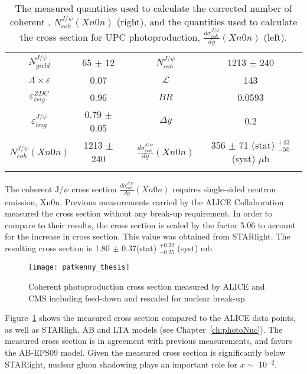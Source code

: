    \begin{table}
      \centering
      \begin{tabular}{|c|c|c|c|c|} \hhline{--~--} 
        $N^{J/\psi}_{yield}$ & 65 $\pm$ 12 & & $N^{J/\psi}_{coh}$  & 1213 $\pm$ 240 \\ \hhline{--~--}  
        $A\times \varepsilon$ & 0.07 & & $\mathcal{L}$ & 143 \\ \hhline{--~--}
        $\varepsilon^{ZDC}_{trig}$ & 0.96 & & $BR$ & 0.0593 \\ \hhline{--~--}
        $\varepsilon^{J/\psi}_{trig}$ & 0.79 $\pm$ 0.05 & & $\Delta y$ & 0.2 \\ \hhline{--~--} \hhline{--~--}
        $N^{J/\psi{}}_{coh} (Xn0n)$ & 1213 $\pm$ 240 & & $\frac{d\sigma^{J/\psi}_{coh}}{dy} (Xn0n)$ & 356 $\pm$ 71 (stat) $^{+43}_{-50}$ (syst) $\mu$b \\  \hhline{--~--}
      \end{tabular}
      \caption{\label{tab:nJpCoh}The measured quantities used to calculate the 
        corrected number of coherent \JPsi{}, $N^{J/\psi}_{coh} (Xn0n)$ (right),
        and the quantities used to calculate the cross section for UPC \JPsi{} 
        photoproduction, $\frac{d\sigma^{J/\psi}_{coh}}{dy} (Xn0n)$ (left).}
    \end{table}  
    
    The coherent J/$\psi$ cross section 
      $\frac{d\sigma^{J/\psi}_{coh}}{dy} (Xn0n)$ requires single-sided neutron
      emission, Xn0n. 
    Previous measurements carried by the ALICE Collaboration measured the cross
      section without any break-up requirement. 
    In order to compare to their results, the cross section is scaled by the 
      factor 5.06 to account for the increase in cross section. 
    This value was obtained from STARlight. 
    The resulting cross section is 1.80 $\pm$ 0.37(stat) $^{+0.22}_{-0.25}$ (syst) mb.
 
    \begin{figure}[!Hhbt]
      \centering
      \texttt{[image: patkenny\_thesis]}
      \caption{Coherent \JPsi{} photoproduction cross section measured by ALICE 
        and CMS including feed-down and rescaled for nuclear break-up.}
      \label{fig:coJpXsec}
    \end{figure}
    Figure~\ref{fig:coJpXsec} shows the measured cross section compared to the 
      ALICE data points, as well as STARligh, AB and LTA models 
      (see Chapter~\ref{ch:photoNuc}). 
    The measured cross section is in agreement with previous measurements, and 
      favors the AB-EPS09 model. 
    Given the measured cross section is significantly below STARlight, nuclear 
      gluon shadowing plays an important role for $x\sim$ 10$^{-2}$. 


